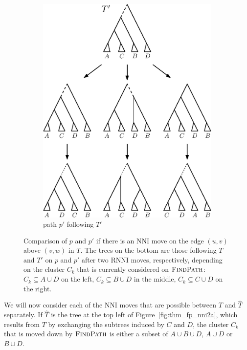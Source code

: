 \documentclass{amsart}
\newcommand{\rnni}{\mathrm{RNNI}}
\newcommand{\findpath}{\textsc{FindPath}}
\newcommand{\nni}{\mathrm{NNI}}
\begin{document}
\begin{enumerate}[{Case} (1).]
\begin{figure}[H]
\begin{subfigure}[b]{.45\textwidth}
		\includegraphics[width=0.9\linewidth]{thm_fp_nni2b.eps}
		\vspace{12pt}
		\caption{path $p'$ following $T'$}
		\label{fig:thm_fp_nni2b}
	\end{subfigure}
	\caption{Comparison of $p$ and $p'$ if there is an $\nni$ move on the edge $(u,v)$ above $(v,w)$ in $T$.
	The trees on the bottom are those following $T$ and $T'$ on $p$ and $p'$ after two $\rnni$ moves, respectively, depending on the cluster $C_k$ that is currently considered on $\findpath$:
	${C_k \subseteq A \cup D}$ on the left, ${C_k \subseteq B \cup D}$ in the middle, ${C_k \subseteq C \cup D}$ on the right.}
\end{figure}

We will now consider each of the $\nni$ moves that are possible between $T$ and $\hat T$ separately.
If $\hat T$ is the tree at the top left of Figure~\ref{fig:thm_fp_nni2a}, which results from $T$ by exchanging the subtrees induced by $C$ and $D$, the cluster $C_k$ that is moved down by $\findpath$ is either a subset of $A \cup B \cup D$, $A \cup D$ or $B \cup D$.


\end{enumerate}
\end{document}
